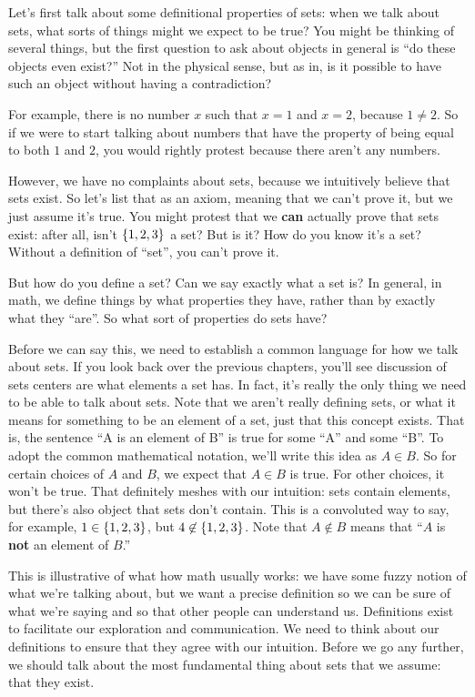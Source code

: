 Let's first talk about some definitional properties of sets: when we talk about sets, what sorts of things might we expect to be true?
You might be thinking of several things, but the first question to ask about objects in general is ``do these objects even exist?''
Not in the physical sense, but as in, is it possible to have such an object without having a contradiction?

For example, there is no number $x$ such that $x = 1$ and $x = 2$, because $1 \neq 2$.
So if we were to start talking about numbers that have the property of being equal to both $1$ and $2$, you would rightly protest because there aren't any numbers.

However, we have no complaints about sets, because we intuitively believe that sets exist.
So let's list that as an axiom, meaning that we can't prove it, but we just assume it's true.
You might protest that we \textbf{can} actually prove that sets exist: after all, isn't ${\left\{ {1,2,3} \right\}}$ a set?
But is it?
How do you know it's a set?
Without a definition of ``set'', you can't prove it.

But how do you define a set?
Can we say exactly what a set is?
In general, in math, we define things by what properties they have, rather than by exactly what they ``are''.
So what sort of properties do sets have?

Before we can say this, we need to establish a common language for how we talk about sets.
If you look back over the previous chapters, you'll see discussion of sets centers are what elements a set has.
In fact, it's really the only thing we need to be able to talk about sets.
Note that we aren't really defining sets, or what it means for something to be an element of a set, just that this concept exists.
That is, the sentence ``A is an element of B'' is true for some ``A'' and some ``B''.
To adopt the common mathematical notation, we'll write this idea as $A \in B$.
So for certain choices of $A$ and $B$, we expect that $A \in B$ is true.
For other choices, it won't be true.
That definitely meshes with our intuition: sets contain elements, but there's also object that sets don't contain.
This is a convoluted way to say, for example, $1 \in {\left\{ {1,2,3} \right\}}$, but $4 \not\in {\left\{ {1,2,3} \right\}}$.
Note that $A \not\in B$ means that ``$A$ is \textbf{not} an element of $B$.''

This is illustrative of what how math usually works: we have some fuzzy notion of what we're talking about, but we want a precise definition so we can be sure of what we're saying and so that other people can understand us.
Definitions exist to facilitate our exploration and communication.
We need to think about our definitions to ensure that they agree with our intuition.
Before we go any further, we should talk about the most fundamental thing about sets that we assume: that they exist.

